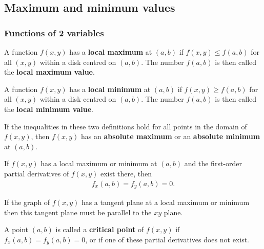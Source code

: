 \documentclass{article}
\begin{document}
\subsection{Maximum and minimum values}


\subsubsection{Functions of 2 variables}

\begin{definition}
    A function $f(x,y)$ has a \textbf{local maximum} at $(a,b)$ if $f(x,y)\leq f(a,b)$
    for all $(x,y)$ within a disk centred on $(a,b)$. The number $f(a,b)$
    is then called the \textbf{local maximum value}.
\end{definition}
\begin{definition}
    A function $f(x,y)$ has a \textbf{local minimum} at $(a,b)$ if $f(x,y)\geq f(a,b)$
    for all $(x,y)$ within a disk centred on $(a,b)$. The number $f(a,b)$
    is then called the \textbf{local minimum value}.
\end{definition}
\begin{definition}
    If the inequalities in these two definitions hold for all points in the
    domain of $f(x,y)$, then $f(x,y)$ has an \textbf{absolute maximum} or an
    \textbf{absolute minimum} at $(a,b)$.
\end{definition}
\begin{theorem}
    If $f(x,y)$ has a local maximum or minimum at $(a,b)$ and the first-order
    partial derivatives of $f(x,y)$ exist there, then
    \begin{align*}
        f_x(a,b) = f_y(a,b) = 0.
    \end{align*}
\end{theorem}
\begin{lemma}
    If the graph of $f(x,y)$ has a tangent plane at a local maximum or minimum
    then this tangent plane must be parallel to the $xy$ plane.
\end{lemma}
\begin{definition}
    A point $(a,b)$ is called a \textbf{critical point} of $f(x,y)$ if
    $f_x(a,b)=f_y(a,b)=0$, or if one of these partial derivatives does not exist.
\end{definition}
\end{document}
